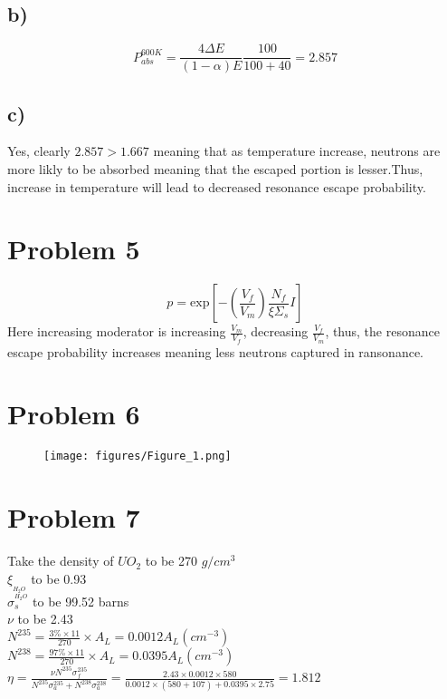 \documentclass{article}
\begin{document}
\subsection*{b)}
\[P_{abs}^{600K}=\frac{4\Delta E}{(1-\alpha)E}\frac{100}{100+40}=2.857\]
\subsection*{c)}
Yes, clearly \(2.857>1.667\)  meaning that as temperature increase, neutrons are more likly to be absorbed meaning that the escaped portion is lesser.Thus, increase in temperature will lead to decreased resonance escape probability.
\newpage
\section*{Problem 5}

\[p=\text{exp}\left[-\left(\frac{V_f}{V_m}\right)\frac{N_f}{\xi \Sigma_s}I\right]\]
Here increasing moderator is increasing \(\displaystyle \frac{V_m}{V_f}\), decreasing \(\displaystyle \frac{V_f}{V_m}\), thus, 
the resonance escape probability increases meaning less neutrons captured in ransonance.

\section*{Problem 6}
\begin{figure}[h]
    \texttt{[image: figures/Figure\_1.png]}
\end{figure}
\newpage
\section*{Problem 7}
Take the density of \(UO_2\) to be 270 \(g/cm^3\)\\
\(\xi_{_{H_2O}}\) to be 0.93\\
\(\sigma_s^{^{H_2O}}\) to be 99.52 barns\\
\(\nu\) to be 2.43\\
\(\displaystyle N^{235}=\frac{3\%\times 11}{270}\times A_L=0.0012A_L (cm^{-3})\)\\
\(\displaystyle N^{238}=\frac{97\%\times 11}{270}\times A_L=0.0395A_L (cm^{-3})\)\\
\(\displaystyle \eta = \frac {\nu N^{235} \sigma^{235}_{f}}{N^{235}\sigma_{a}^{235}+N^{238}\sigma_{a}^{238}}
=\frac{2.43\times 0.0012\times 580}{0.0012\times (580+107)+0.0395\times 2.75}=1.812\)\\
\end{document}
